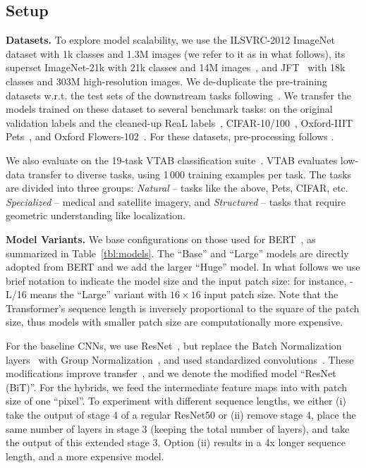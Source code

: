\subsection{Setup}

\textbf{Datasets.}
To explore model scalability, we use the ILSVRC-2012 ImageNet dataset with 1k classes and 1.3M images (we refer to it as \imagenet in what follows),
its superset ImageNet-21k with 21k classes and 14M images~\citep{deng2009-imagenet},
and JFT~\citep{sun2017-jft} with  18k classes and 303M high-resolution images.
We de-duplicate the pre-training datasets w.r.t. the test sets of the downstream tasks following~\citet{kolesnikov2020-bit}.
We transfer the models trained on these dataset to several benchmark tasks:
\imagenet on the original validation labels and the cleaned-up ReaL labels~\citep{beyer2020-imagenet},
CIFAR-10/100~\citep{Krizhevsky2009-cifar}, 
Oxford-IIIT Pets~\citep{parkhi2012-pets}, 
and  Oxford Flowers-102~\citep{Nilsback2008-flowers}.
For these datasets, pre-processing follows \citet{kolesnikov2020-bit}.

We also evaluate on the 19-task VTAB classification suite~\citep{vtab}.
VTAB evaluates low-data transfer to diverse tasks, using 1\,000 training examples per task.
The tasks are divided into three groups: 
\textit{Natural} -- tasks like the above, Pets, CIFAR, etc.
\textit{Specialized} -- medical and satellite imagery, and
\textit{Structured} -- tasks that require geometric understanding like localization.

\textbf{Model Variants.}
We base \oursabbrv{} configurations on those used for BERT~\citep{devlin19-bert}, as summarized in Table~\ref{tbl:models}. 
The ``Base'' and ``Large'' models are directly adopted from BERT and we add the larger ``Huge'' model.
In what follows we use brief notation to indicate the model size and the input patch size: for instance, \oursabbrv{}-L/16 means the ``Large'' variant with $16\times 16$ input patch size.
Note that the Transformer's sequence length is inversely proportional to the square of the patch size, thus models with smaller patch size are computationally more expensive.

For the baseline CNNs, we use ResNet~\citep{he2016deep}, but replace the Batch Normalization layers~\citep{ioffe2015batch} with Group Normalization~\citep{wu2018group}, and used standardized convolutions~\citep{qiao2019ws}.
These modifications improve transfer~\citep{kolesnikov2020-bit}, and we denote the modified model ``ResNet (BiT)''.
For the hybrids, we feed the intermediate feature maps into \oursabbrv{} with patch size of one ``pixel''.
To experiment with different sequence lengths, we either
(i) take the output of stage 4 of a regular ResNet50 or
(ii) remove stage 4, place the same number of layers in stage 3 (keeping the total number of layers), and take the output of this extended stage 3.
Option (ii) results in a 4x longer sequence length, and a more expensive \oursabbrv{} model.

